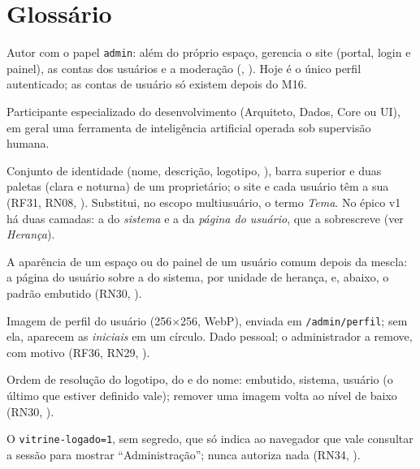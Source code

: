 \chapter{Glossário}\label{ap:glossario}

\begin{description}[style=nextline, leftmargin=0.6cm, itemsep=4pt]
  \item[Administrador] Autor com o papel \texttt{admin}: além do próprio espaço, gerencia o site (portal, login e painel), as contas dos usuários e a moderação (, ). Hoje é o único perfil autenticado; as contas de usuário só existem depois do M16.
  \item[Agente] Participante especializado do desenvolvimento (Arquiteto, Dados, Core ou UI), em geral uma ferramenta de inteligência artificial operada sob supervisão humana.
  \item[Aparência] Conjunto de identidade (nome, descrição, logotipo, ), barra superior e duas paletas (clara e noturna) de um proprietário; o site e cada usuário têm a sua (RF31, RN08, ). Substitui, no escopo multiusuário, o termo \emph{Tema}. No épico v1 há duas camadas: a do \emph{sistema} e a da \emph{página do usuário}, que a sobrescreve (ver \emph{Herança}).
  \item[Aparência efetiva] A aparência de um espaço ou do painel de um usuário comum depois da mescla: a página do usuário sobre a do sistema, por unidade de herança, e, abaixo, o padrão embutido (RN30, ).
  \item[Avatar] Imagem de perfil do usuário (256$\times$256, WebP), enviada em \texttt{/admin/perfil}; sem ela, aparecem as \emph{iniciais} em um círculo. Dado pessoal; o administrador a remove, com motivo (RF36, RN29, ).
  \item[Cadeia de padrões] Ordem de resolução do logotipo, do  e do nome: embutido, sistema, usuário (o último que estiver definido vale); remover uma imagem volta ao nível de baixo (RN30, ).
  \item[\en{Cookie}-marcador] O  \texttt{vitrine-logado=1}, sem segredo, que só indica ao navegador que vale consultar a sessão para mostrar ``Administração''; nunca autoriza nada (RN34, ).

\end{description}
